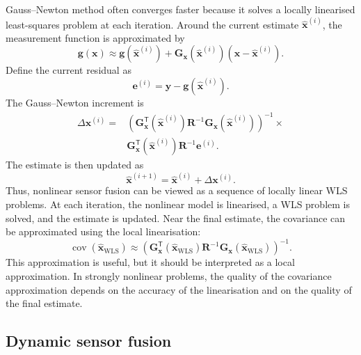 \documentclass[11pt,oneside,openany]{book}
\begin{document}
Gauss--Newton method often converges faster because it solves a locally linearised least-squares problem at each iteration. Around the current estimate $\widehat{\mathbf{x}}^{(i)}$, the measurement function is approximated by
\begin{equation}
\mathbf{g}(\mathbf{x}) \approx \mathbf{g} \left( \widehat{\mathbf{x}}^{(i)} \right) + \mathbf{G}_{\mathbf{x}} \left( \widehat{\mathbf{x}}^{(i)} \right) \left( \mathbf{x} - \widehat{\mathbf{x}}^{(i)} \right).
\end{equation}
Define the current residual as
\begin{equation}
\mathbf{e}^{(i)} = \mathbf{y} - \mathbf{g} \left( \widehat{\mathbf{x}}^{(i)} \right).
\end{equation}
The Gauss--Newton increment is
\begin{align}
\Delta \mathbf{x}^{(i)} = &\left(
\mathbf{G}_{\mathbf{x}}^{\mathsf T}
\left(
\widehat{\mathbf{x}}^{(i)}
\right)
\mathbf{R}^{-1}
\mathbf{G}_{\mathbf{x}}
\left(
\widehat{\mathbf{x}}^{(i)}
\right)
\right)^{-1} \times \nonumber \\
&\mathbf{G}_{\mathbf{x}}^{\mathsf T}
\left(
\widehat{\mathbf{x}}^{(i)}
\right)
\mathbf{R}^{-1}
\mathbf{e}^{(i)}.
\end{align}
The estimate is then updated as
\begin{equation}
\widehat{\mathbf{x}}^{(i+1)} = \widehat{\mathbf{x}}^{(i)} + \Delta \mathbf{x}^{(i)}.
\end{equation}
Thus, nonlinear sensor fusion can be viewed as a sequence of locally linear WLS problems. At each iteration, the nonlinear model is linearised, a WLS problem is solved, and the estimate is updated. Near the final estimate, the covariance can be approximated using the local linearisation:
\begin{equation}
\operatorname{cov} \left( \widehat{\mathbf{x}}_{\mathrm{WLS}} \right) \approx \left(\mathbf{G}_{\mathbf{x}}^{\mathsf T}\left(\widehat{\mathbf{x}}_{\mathrm{WLS}}\right) \mathbf{R}^{-1} \mathbf{G}_{\mathbf{x}} \left( \widehat{\mathbf{x}}_{\mathrm{WLS}} \right)\right)^{-1}.
\end{equation}
This approximation is useful, but it should be interpreted as a local approximation. In strongly nonlinear problems, the quality of the covariance approximation depends on the accuracy of the linearisation and on the quality of the final estimate.

\subsection{Dynamic sensor fusion}
\end{document}

